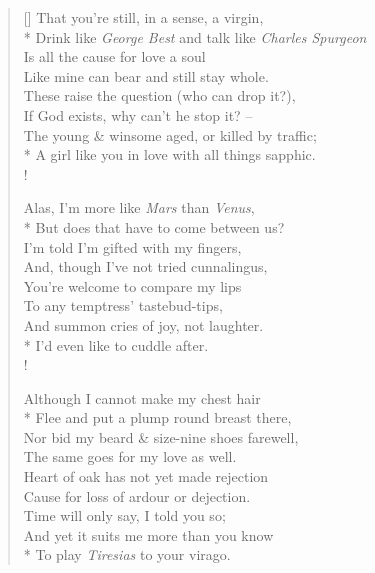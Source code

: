 \settowidth{\versewidth}{The young \& winsome aged, or killed by traffic;}
\begin{verse}[\versewidth]
That you're still, in a sense, a virgin,\\*
Drink like \textit{George Best} and talk like \textit{Charles Spurgeon}\\
Is all the cause for love a soul\\
Like mine can bear and still stay whole.\\
These raise the question (who can drop it?),\\
If God exists, why can't he stop it? --\\
The young \& winsome aged, or killed by traffic;\\*
A girl like you in love with all things sapphic.\\!

Alas, I'm more like \textit{Mars} than \textit{Venus},\\*
But does that have to come between us?\\
I'm told I'm gifted with my fingers,\\
And, though I've not tried cunnalingus,\\
You're welcome to compare my lips\\
To any temptress' tastebud-tips,\\
And summon cries of joy, not laughter.\\*
I'd even like to cuddle after.\\!

Although I cannot make my chest hair\\*
Flee and put a plump round breast there,\\
Nor bid my beard \& size-nine shoes farewell,\\
The same goes for my love as well.\\
Heart of oak has not yet made rejection\\
Cause for loss of ardour or dejection.\\
Time will only say, I told you so;\\
And yet it suits me more than you know\\*
To play \textit{Tiresias} to your virago.
\end{verse}
